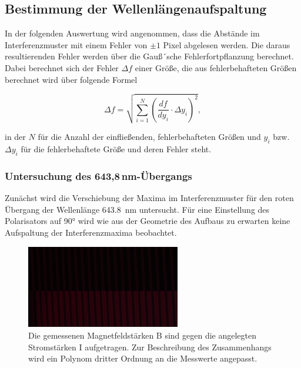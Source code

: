         \FloatBarrier

    \newpage
    \subsection{Bestimmung der Wellenlängenaufspaltung}
        In der folgenden Auswertung wird angenommen, dass die Abstände im Interferenzmuster mit einem Fehler von $\pm 1$ Pixel abgelesen werden. Die daraus resultierenden Fehler werden über die Gauß´sche
        Fehlerfortpflanzung berechnet. Dabei berechnet sich der Fehler $\Delta f$ einer Größe, die aus fehlerbehafteten Größen berechnet wird über folgende Formel
        
        \begin{equation*}
          \Delta f = \sqrt{\sum_{i=1}^N (\frac{df}{dy_i}\cdot \Delta y_i)^2},
        \end{equation*}

        in der $N$ für die Anzahl der einfließenden, fehlerbehafteten Größen und $y_i$ bzw. $\Delta y_i$ für die fehlerbehaftete Größe und deren Fehler steht.

        \subsubsection*{Untersuchung des 643,8\,nm-Übergangs}
            Zunächst wird die Verschiebung der Maxima im Interferenzmuster für den roten Übergang der Wellenlänge \SI{643.8}{\nano\metre} untersucht. Für eine Einstellung des Polarisators auf 90° wird wie aus
            der Geometrie des Aufbaus zu erwarten keine Aufspaltung der Interferenzmaxima beobachtet.

            \FloatBarrier

            \begin{figure}[h]
              \centering
              \includegraphics[width = 0.6\textwidth]{pictures/rot_sigma.png}
              \caption{Die gemessenen Magnetfeldstärken B sind gegen die angelegten Stromstärken I aufgetragen. Zur Beschreibung des Zusammenhangs wird ein Polynom dritter Ordnung an die Messwerte angepasst.}
              \label{fig:rot_sigma}
            \end{figure}
        
